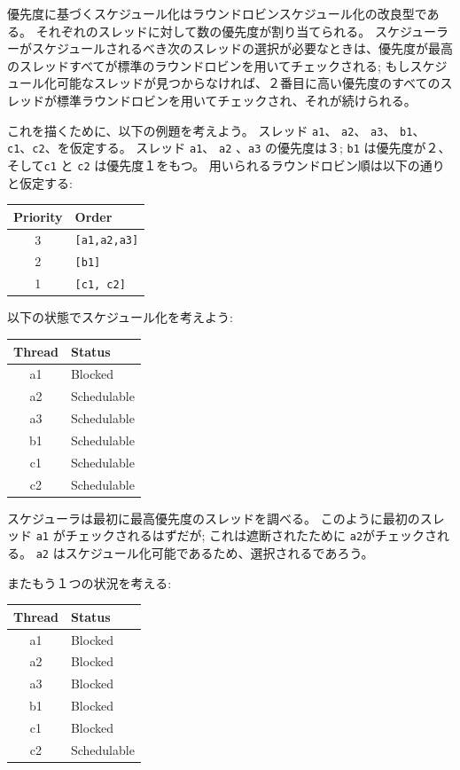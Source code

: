 \documentclass[\pformat,12pt]{jreport}
\begin{document}
優先度に基づくスケジュール化はラウンドロビンスケジュール化の改良型である。
それぞれのスレッドに対して数の優先度が割り当てられる。
スケジューラーがスケジュールされるべき次のスレッドの選択が必要なときは、優先度が最高のスレッドすべてが標準のラウンドロビンを用いてチェックされる; もしスケジュール化可能なスレッドが見つからなければ、２番目に高い優先度のすべてのスレッドが標準ラウンドロビンを用いてチェックされ、それが続けられる。

これを描くために、以下の例題を考えよう。
スレッド \texttt{a1}、 \texttt{a2}、 \texttt{a3}、 \texttt{b1}、
\texttt{c1}、\texttt{c2}、を仮定する。 
スレッド \texttt{a1}、 \texttt{a2} 、\texttt{a3} の優先度は３; \texttt{b1} は優先度が２、そして\texttt{c1} と \texttt{c2} は優先度１をもつ。
用いられるラウンドロビン順は以下の通りと仮定する:

\begin{tabular}{cl}
Priority & Order \\ \hline
3        & \texttt{[a1,a2,a3]} \\
2        & \texttt{[b1]} \\
1        & \texttt{[c1, c2]} \\
\end{tabular}

以下の状態でスケジュール化を考えよう:

\begin{tabular}{cl}
Thread & Status \\ \hline
a1 & Blocked \\
a2 & Schedulable \\
a3 & Schedulable \\
b1 & Schedulable \\
c1 & Schedulable \\
c2 & Schedulable \\
\end{tabular}

スケジューラは最初に最高優先度のスレッドを調べる。
このように最初のスレッド \texttt{a1} がチェックされるはずだが; これは遮断されたために \texttt{a2}がチェックされる。 \texttt{a2} はスケジュール化可能であるため、選択されるであろう。

またもう１つの状況を考える:

\begin{tabular}{cl}
Thread & Status \\ \hline
a1 & Blocked \\
a2 & Blocked \\
a3 & Blocked\\
b1 & Blocked\\
c1 & Blocked\\
c2 & Schedulable\\
\end{tabular}
\end{document}
